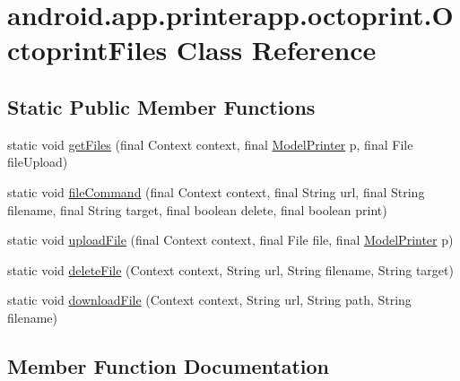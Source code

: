 \hypertarget{classandroid_1_1app_1_1printerapp_1_1octoprint_1_1_octoprint_files}{}\section{android.\+app.\+printerapp.\+octoprint.\+Octoprint\+Files Class Reference}
\label{classandroid_1_1app_1_1printerapp_1_1octoprint_1_1_octoprint_files}
\subsection*{Static Public Member Functions}
\begin{DoxyCompactItemize}
\item 
static void \hyperlink{classandroid_1_1app_1_1printerapp_1_1octoprint_1_1_octoprint_files_a04ebfc28597edba17fe346c4e3377dc3}{get\+Files} (final Context context, final \hyperlink{classandroid_1_1app_1_1printerapp_1_1model_1_1_model_printer}{Model\+Printer} p, final File file\+Upload)
\item 
static void \hyperlink{classandroid_1_1app_1_1printerapp_1_1octoprint_1_1_octoprint_files_addb51aaff3aba9dcb4bce0d2a705d40e}{file\+Command} (final Context context, final String url, final String filename, final String target, final boolean delete, final boolean print)
\item 
static void \hyperlink{classandroid_1_1app_1_1printerapp_1_1octoprint_1_1_octoprint_files_a237707145e28ece8677a2accecf3f7af}{upload\+File} (final Context context, final File file, final \hyperlink{classandroid_1_1app_1_1printerapp_1_1model_1_1_model_printer}{Model\+Printer} p)
\item 
static void \hyperlink{classandroid_1_1app_1_1printerapp_1_1octoprint_1_1_octoprint_files_a9dd2dff2b34b82dd88d7e0420977eb02}{delete\+File} (Context context, String url, String filename, String target)
\item 
static void \hyperlink{classandroid_1_1app_1_1printerapp_1_1octoprint_1_1_octoprint_files_a8f4d80cbaead4476c4e91b75be4b6c99}{download\+File} (Context context, String url, String path, String filename)
\end{DoxyCompactItemize}


\subsection{Member Function Documentation}
\mbox{\label{classandroid_1_1app_1_1printerapp_1_1octoprint_1_1_octoprint_files_a9dd2dff2b34b82dd88d7e0420977eb02}} 
